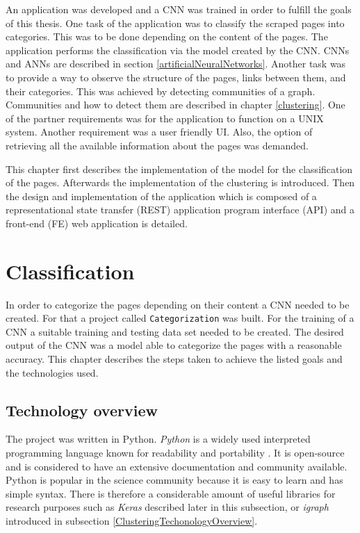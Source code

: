 \label{developmentIntroduction}
An application was developed and a CNN was trained in order to fulfill the goals of this thesis. One task of the application was to classify the scraped pages into categories. This was to be done depending on the content of the pages. The application performs the classification via the model created by the CNN. CNNs and ANNs are described in section \ref{artificialNeuralNetworks}. Another task was to provide a way to observe the structure of the pages, links between them, and their categories. This was achieved by detecting communities of a graph. Communities and how to detect them are described in chapter \ref{clustering}. One of the partner requirements was for the application to function on a UNIX system. Another requirement was a user friendly UI. Also, the option of retrieving all the available information about the pages was demanded. 

This chapter first describes the implementation of the model for the classification of the pages. Afterwards the implementation of the clustering is introduced. Then the design and implementation of the application which is composed of a representational state transfer (REST) application program interface (API) and a front-end (FE) web application is detailed. 

\section{Classification} \label{ClassificationDevelopment}
In order to categorize the pages depending on their content a CNN needed to be created. For that a project called \texttt{Categorization} was built. For the training of a CNN a suitable training and testing data set needed to be created. The desired output of the CNN was a model able to categorize the pages with a reasonable accuracy. This chapter describes the steps taken to achieve the listed goals and the technologies used.

\subsection{Technology overview} \label{ClassificationTechonologyOverview}
The project was written in Python. \textit{Python} is a widely used interpreted programming language known for readability and portability \cite{aboutPython}. It is open-source and is considered to have an extensive documentation and community available. Python is popular in the science community because it is easy to learn and has simple syntax. There is therefore a considerable amount of useful libraries for research purposes such as \textit{Keras} described later in this subsection, or \textit{igraph} introduced in subsection \ref{ClusteringTechonologyOverview}.  

